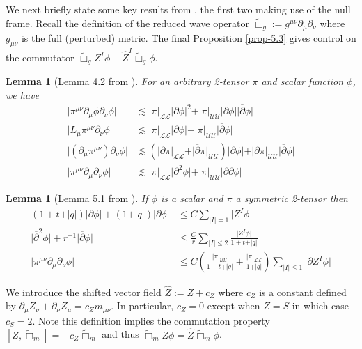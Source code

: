 \documentclass[11pt, a4paper]{amsart}
\numberwithin{equation}{section}
\newtheorem{lemma}[theorem]{Lemma}
\numberwithin{theorem}{section}
\newcommand{\p}{\partial}
\newcommand{\mn}{{\mu \nu}}
\newcommand{\pgood}{\overline{\partial}}
\newcommand{\tbox}{\widetilde{\Box}}
\newcommand{\UU}{{\mathcal{U} \mathcal{U}}}
\newcommand{\LL}{{\mathcal{L} \mathcal{L}}}
\begin{document}
We next briefly state some key results from \cite{LR:04}, the first two making use of the null frame. Recall the definition of the reduced wave operator $\tbox_g := g^\mn \p_\mu \p_\nu$ where $g_\mn$ is the full (perturbed) metric. The final Proposition \ref{prop-5.3} gives control on the commutator  $\tbox_g Z^I \phi - \hat{Z}^I \tbox_g \phi$.
\begin{lemma}[Lemma 4.2 from \cite{LR:04}] \label{lemma-4.2a}
For an arbitrary 2-tensor $\pi$ and scalar function $\phi$, we have
\begin{align*}
\vert \pi^\mn \p_\mu \phi \p_\nu \phi \vert &\lesssim \vert \pi \vert_{\mathcal{L} \mathcal{L}} \vert \p \phi \vert^2 + \vert \pi \vert_\UU \vert \p \phi \vert \vert \overline{\p} \phi \vert \\
\vert L_\mu \pi^\mn \p_\nu \phi \vert & \lesssim \vert \pi \vert_{\mathcal{L} \mathcal{L}} \vert \p \phi \vert + \vert \pi \vert_\UU \vert \overline{\p} \phi \vert \\
\vert ( \p_\mu \pi^\mn ) \p_\nu \phi \vert & \lesssim \left( \vert \p \pi \vert_{\mathcal{L} \mathcal{L}} +  \vert \overline{\p} \pi \vert_\UU   \right) \vert \p \phi \vert +\vert \p \pi  \vert_\UU  \vert \overline{\p} \phi \vert \\
\vert \pi^\mn \p_\mu \p_\nu \phi \vert & \lesssim \vert \pi \vert_{\mathcal{L} \mathcal{L}} \vert \p^2 \phi \vert + \vert \pi \vert_\UU \vert \overline{\p} \p \phi \vert 
\end{align*}
\end{lemma}

\begin{lemma}[Lemma 5.1 from \cite{LR:04}] \label{lemma-5.1}
If $\phi$ is a scalar and $\pi$ a symmetric 2-tensor then
\begin{align}
( 1+t+\vert q \vert ) \vert \pgood \phi \vert + (1+\vert q \vert) \vert \p \phi \vert & \leq C \sum_{\vert I \vert = 1} \vert Z^I \phi \vert \\
\vert  \pgood^2 \phi \vert + r^{-1} \vert \pgood \phi \vert & \leq \frac{C}{r} \sum_{\vert I \vert \leq 2} \frac{\vert Z^I \phi \vert}{1+t + \vert q \vert} \\
\vert \pi^{\mu \nu} \p_\mu \p_\nu \phi \vert &\leq C \left( \frac{\vert \pi \vert_\UU}{1+t+\vert q \vert} + \frac{\vert \pi \vert_\LL}{1+\vert q \vert} \right) \sum_{\vert I \vert \leq 1} \vert \p Z^I \phi \vert \label{eq:lemma5.1-3rd-eq}
\end{align}
\end{lemma}
We introduce the shifted vector field $\hat{Z} := Z + c_Z$ where $c_Z$ is a constant defined by $\p_\mu Z_\nu + \p_\nu Z_\mu = c_Z m_\mn$. In particular, $c_Z = 0$ except when $Z = S$ in which case $c_S = 2$. Note this definition implies the commutation property $[Z, \tbox_m] = -c_Z \tbox_m$ and thus $\tbox_m Z \phi = \hat{Z} \tbox_m \phi$. 
\end{document}
